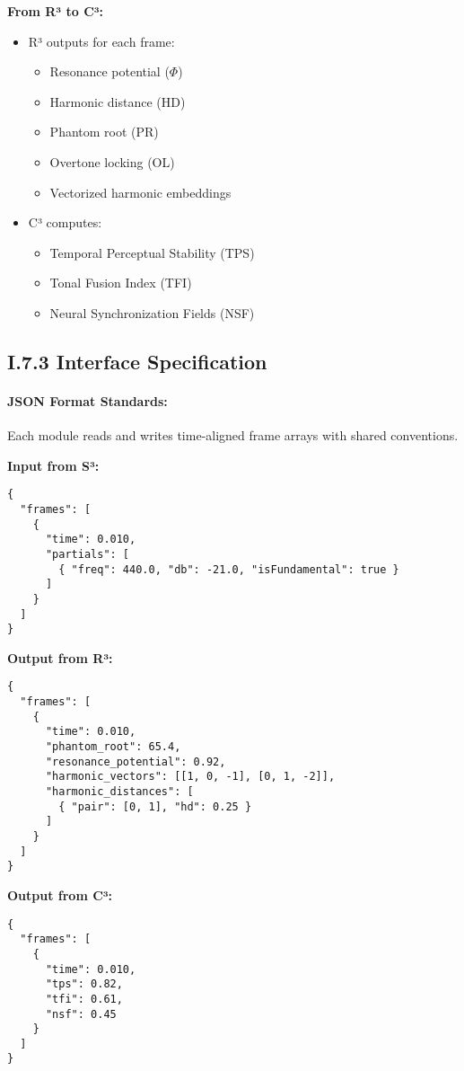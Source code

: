 \textbf{From R³ to C³:}

\begin{itemize}
    \item R³ outputs for each frame:
    \begin{itemize}
        \item Resonance potential ($\Phi$)
        \item Harmonic distance (HD)
        \item Phantom root (PR)
        \item Overtone locking (OL)
        \item Vectorized harmonic embeddings
    \end{itemize}
    \item C³ computes:
    \begin{itemize}
        \item Temporal Perceptual Stability (TPS)
        \item Tonal Fusion Index (TFI)
        \item Neural Synchronization Fields (NSF)
    \end{itemize}
\end{itemize}

\subsection*{I.7.3 Interface Specification}

\paragraph{JSON Format Standards:}
Each module reads and writes time-aligned frame arrays with shared conventions.

\textbf{Input from S³:}
\begin{verbatim}
{
  "frames": [
    {
      "time": 0.010,
      "partials": [
        { "freq": 440.0, "db": -21.0, "isFundamental": true }
      ]
    }
  ]
}
\end{verbatim}

\textbf{Output from R³:}
\begin{verbatim}
{
  "frames": [
    {
      "time": 0.010,
      "phantom_root": 65.4,
      "resonance_potential": 0.92,
      "harmonic_vectors": [[1, 0, -1], [0, 1, -2]],
      "harmonic_distances": [
        { "pair": [0, 1], "hd": 0.25 }
      ]
    }
  ]
}
\end{verbatim}

\textbf{Output from C³:}
\begin{verbatim}
{
  "frames": [
    {
      "time": 0.010,
      "tps": 0.82,
      "tfi": 0.61,
      "nsf": 0.45
    }
  ]
}
\end{verbatim}

